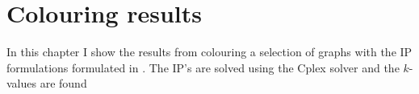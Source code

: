 \chapter{Colouring results}
In this chapter I show the results from colouring a selection of graphs with the IP formulations formulated in . The IP's are solved using the Cplex solver and the $k$-values are found 